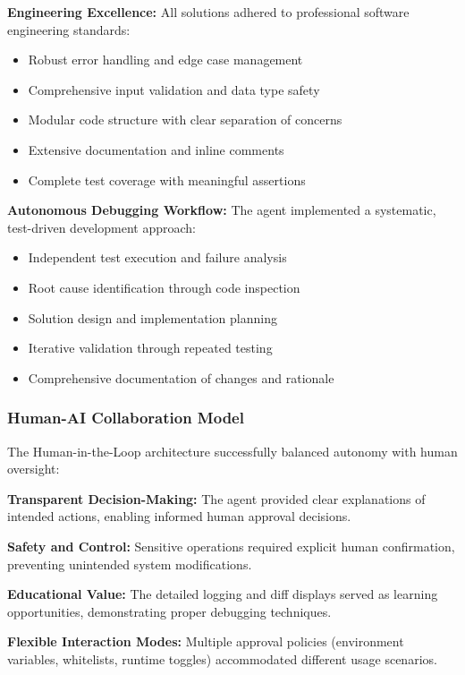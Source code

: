 \documentclass[12pt, a4paper]{article}
\begin{document}
\textbf{Engineering Excellence:} All solutions adhered to professional software engineering standards:
\begin{itemize}
    \item Robust error handling and edge case management
    \item Comprehensive input validation and data type safety
    \item Modular code structure with clear separation of concerns
    \item Extensive documentation and inline comments
    \item Complete test coverage with meaningful assertions
\end{itemize}

\textbf{Autonomous Debugging Workflow:} The agent implemented a systematic, test-driven development approach:
\begin{itemize}
    \item Independent test execution and failure analysis
    \item Root cause identification through code inspection
    \item Solution design and implementation planning
    \item Iterative validation through repeated testing
    \item Comprehensive documentation of changes and rationale
\end{itemize}

\subsubsection{Human-AI Collaboration Model}

The Human-in-the-Loop architecture successfully balanced autonomy with human oversight:

\textbf{Transparent Decision-Making:} The agent provided clear explanations of intended actions, enabling informed human approval decisions.

\textbf{Safety and Control:} Sensitive operations required explicit human confirmation, preventing unintended system modifications.

\textbf{Educational Value:} The detailed logging and diff displays served as learning opportunities, demonstrating proper debugging techniques.

\textbf{Flexible Interaction Modes:} Multiple approval policies (environment variables, whitelists, runtime toggles) accommodated different usage scenarios.
\end{document}
